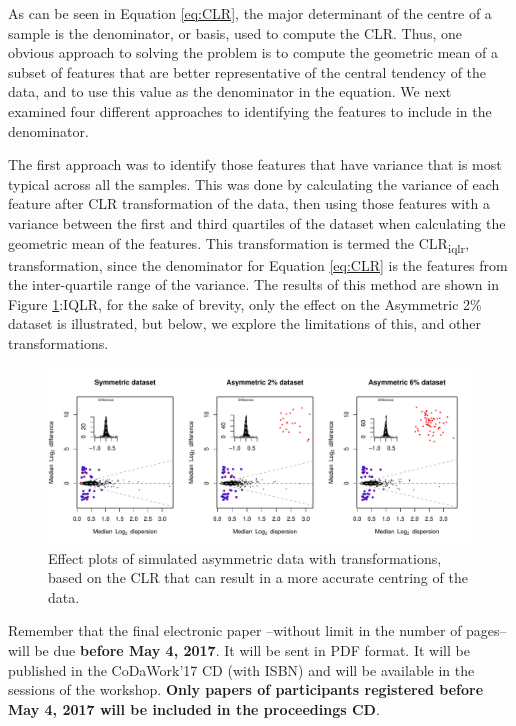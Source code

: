 \documentclass [10pt]{article}
\begin{document}
As can be seen in Equation \ref{eq:CLR}, the major determinant of the centre of a sample is the denominator, or basis, used to compute the CLR. Thus, one obvious approach to solving the problem is to compute the geometric mean of a subset of features that are better representative of the central tendency of the data, and to use this value as the denominator in the equation. We next examined four different approaches to identifying the features to include in the denominator. 

The first approach was to identify those features that have variance that is most typical across all the samples. This was  done by calculating the variance of each feature after CLR transformation of the data, then using those features with a variance between the first and third quartiles of the dataset when calculating the geometric mean of the features. This transformation is termed the CLR\textsubscript{iqlr}, transformation, since the denominator for Equation \ref{eq:CLR} is the features from the inter-quartile range of the variance. The results of this method are shown in Figure \ref{Fig:f2a}:IQLR, for the sake of brevity, only the effect on the Asymmetric 2\% dataset is illustrated, but below, we explore the limitations of this, and other transformations. 

\begin{figure}[ht]
\includegraphics[width=6in]{../figures/Fig_2.pdf}
\vspace{3mm} \caption{Effect plots of simulated asymmetric data with transformations, based on the CLR that can result in a more accurate centring of the data.   }
\label{Fig:f2a}
\end{figure}

Remember that the final electronic paper --without limit in the number of pages-- will be due {\bf before May 4,
2017}. It will be sent in PDF format. It will be published in the CoDaWork'17 CD (with ISBN) and will be available in
the sessions of the workshop. {\bf Only papers of participants registered before May 4, 2017 will be included in the
proceedings CD}.
\end{document}
